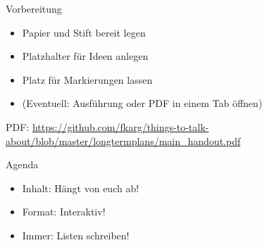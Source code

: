 \begin{frame}[c]{Vorbereitung}
    \begin{itemize}[<+(1)->]
        \item Papier und Stift bereit legen
        \item Platzhalter für Ideen anlegen
        \item Platz für Markierungen lassen
        \item (Eventuell: Ausführung \cite{longtermplans-post} oder PDF \cite{longtermplans-pdf} in einem Tab öffnen)
    \end{itemize}
    \pause
    PDF: \url{https://github.com/fkarg/things-to-talk-about/blob/master/longtermplans/main_handout.pdf}
\end{frame}


\begin{frame}[c]{Agenda}
    \Large
    \begin{itemize}[<+(1)->]
        \item Inhalt: Hängt von euch ab!
        \item Format: Interaktiv!
        \item Immer: Listen schreiben!
    \end{itemize}
\end{frame}


%
%
